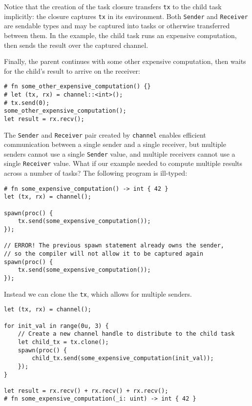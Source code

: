 \documentclass[]{article}
\begin{document}
Notice that the creation of the task closure transfers \texttt{tx} to
the child task implicitly: the closure captures \texttt{tx} in its
environment. Both \texttt{Sender} and \texttt{Receiver} are sendable
types and may be captured into tasks or otherwise transferred between
them. In the example, the child task runs an expensive computation, then
sends the result over the captured channel.

Finally, the parent continues with some other expensive computation,
then waits for the child's result to arrive on the receiver:

\begin{verbatim}
# fn some_other_expensive_computation() {}
# let (tx, rx) = channel::<int>();
# tx.send(0);
some_other_expensive_computation();
let result = rx.recv();
\end{verbatim}

The \texttt{Sender} and \texttt{Receiver} pair created by
\texttt{channel} enables efficient communication between a single sender
and a single receiver, but multiple senders cannot use a single
\texttt{Sender} value, and multiple receivers cannot use a single
\texttt{Receiver} value. What if our example needed to compute multiple
results across a number of tasks? The following program is ill-typed:

\begin{verbatim}
# fn some_expensive_computation() -> int { 42 }
let (tx, rx) = channel();

spawn(proc() {
    tx.send(some_expensive_computation());
});

// ERROR! The previous spawn statement already owns the sender,
// so the compiler will not allow it to be captured again
spawn(proc() {
    tx.send(some_expensive_computation());
});
\end{verbatim}

Instead we can clone the \texttt{tx}, which allows for multiple senders.

\begin{verbatim}
let (tx, rx) = channel();

for init_val in range(0u, 3) {
    // Create a new channel handle to distribute to the child task
    let child_tx = tx.clone();
    spawn(proc() {
        child_tx.send(some_expensive_computation(init_val));
    });
}

let result = rx.recv() + rx.recv() + rx.recv();
# fn some_expensive_computation(_i: uint) -> int { 42 }
\end{verbatim}
\end{document}
